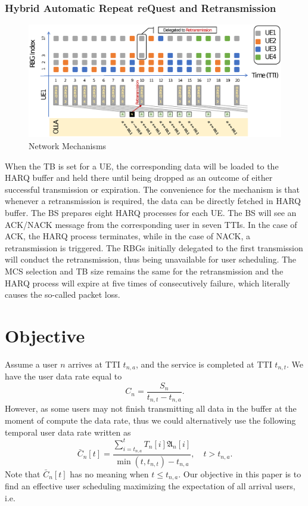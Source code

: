 \documentclass[conference,compsocconf]{IEEEtran}
\begin{document}
\subsubsection{Hybrid Automatic Repeat reQuest and Retransmission}
\begin{figure}
	\centering
	\includegraphics[width=1\linewidth]{Figs/system.eps}
	\caption{Network Mechanisms}
	\label{sys}
\end{figure}

When the TB is set for a UE, the corresponding data will be loaded to the HARQ buffer and held there until being dropped as an outcome of either successful transmission or expiration. The convenience for the mechanism is that whenever a retransmission is required, the data can be directly fetched in HARQ buffer. The BS prepares eight HARQ processes for each UE. The BS will see an ACK/NACK message from the corresponding user in seven TTIs. In the case of ACK, the HARQ process terminates, while in the case of NACK, a retransmission is triggered. The RBGs initially delegated to the first transmission will conduct the retransmission, thus being unavailable for user scheduling. The MCS selection and TB size remains the same for the retransmission and the HARQ process will expire at five times of consecutively failure, which literally causes the so-called packet loss.


\section{Objective}
Assume a user $n$ arrives at TTI $t_{n,a}$, and the service is completed at TTI $t_{n,t}$. We have the user data rate equal to
\begin{equation}
C_n=\frac{S_n}{t_{n,t}-t_{n,a}}.
\end{equation}
However, as some users may not finish transmitting all data in the buffer at the moment of compute the data rate, thus we could alternatively use the following temporal user data rate written as
\begin{equation}
\bar{C}_n[t]=\frac{\sum_{i=t_{n,a}}^{t}T_{n}[i]\mathfrak{A}_n[i]}{\min(t,t_{n,t})-t_{n,a}}, \quad t>t_{n,a}.
\end{equation}
Note that $\bar{C}_n[t]$ has no meaning when $t\leq t_{n,a}$. Our objective in this paper is to find an effective user scheduling maximizing the expectation of all arrival users, i.e.
\end{document}

